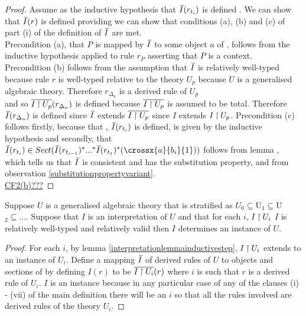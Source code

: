 \begin{proof}
\noindent Assume as the inductive hypothesis that $\Ibar(r_{t_i})$ is defined \foreachi. We can show that $\Ibar(r)$ is defined providing we can show that conditions (a), (b) and (c) of part (i) of the definition of $\Ibar$ are met. \\
\noindent Precondition (a), that $P$ is mapped by $\Ibar$ to some object $a$ of \catc, follows from the inductive hypothesis applied to  rule $r_P$ asserting that $P$ is a context.  \\
\noindent Precondition (b) follows from the assumption that $\Ibar$ is relatively well-typed because rule $r$ is well-typed relative to the theory
$U_p$ because $U$ is a generalised algebraic theory. 
\noindent Therefore $r_{\Delta_n}$ is a derived rule of $U_p$\\ and so $\overline{I \mathbin{\restriction} U_p}(r_{\Delta_n})$ is defined  because $\overline{I \mathbin{\restriction} U_p}$ is assumed to be total. 
Therefore $\Ibar(r_{\Delta_n})$ is defined since
$\Ibar$ extends $\overline{I \mathbin{\restriction} U_p}$ since $I$ extends $I \mathbin{\restriction} U_p$. 
\noindent  Precondition (c) follows firstly, because that \foreachi, $\Ibar(r_{t_i})$ is defined, is given by the inductive hypothesis and 
secondly, that $\Ibar(r_{t_i}) \in Sect(\Ibar(r_{t_{i-1}})^*...^*\Ibar(r_{t_{1}})^*(\crossx{a}{b_i}{1}))$ follows  from lemma , 
which tells us that $\Ibar$ is consistent and has the substitution property, and from observation \ref{substitutionpropertyvariant}.\\
\underline{CF2(b)???}
\end{proof}
\newpage
\begin{lemma}
Suppose $U$ is a  generalised algebraic theory that is stratified as  $U_0 \subseteq $U$_1 \subseteq $U$_2 \subseteq ...$. 
 Suppose that $I$ is an interpretation of $U$  and that  for each $i$, $I \mathbin{\restriction} U_i$  
$I$ is relatively well-typed and relatively valid then $I$ determines an instance of $U$.
\end{lemma}
\begin{proof}
For each $i$, by lemma \ref{interpretationlemmainductivestep}, $I \mathbin{\restriction} U_i$ extends to an instance of $U_i$. Define a mapping
$\Ibar$ of derived rules of $U$ to objects and sections of \catcw by defining $I(r)$ to be $\overline{I \mathbin{\restriction} U_i}(r)$ where
$i$ is such that $r$ is a derived rule of $U_i$. $I$ is an instance because in any particular case of any of the clauses (i) - (vii) of the main definition 
there will be an $i$ so that all the rules involved are derived rules of the theory $U_i$. 
\end{proof}


